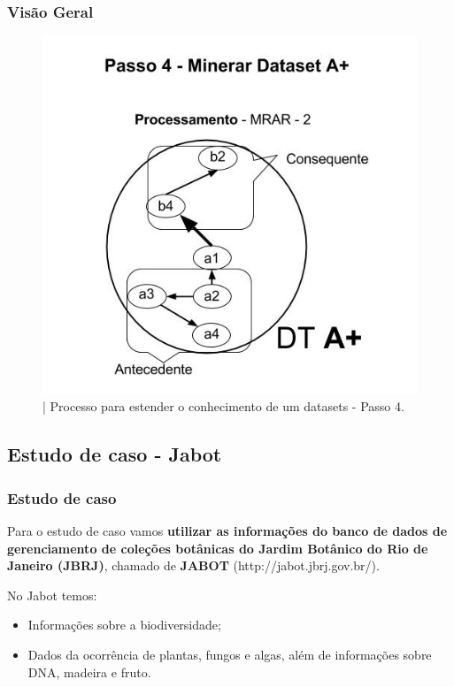 \documentclass[hyperref={pdfpagelabels=false}]{beamer}
\begin{document}
	\begin{frame}
    \frametitle{Visão Geral}
    \begin{figure}[h]
	\centering
		\includegraphics[scale=0.3]{img/VisaoGeralProposta4}
	\caption{| Processo para estender o conhecimento de um datasets  - Passo 4.}
	\label{fig:VisaoGeralProposta4}
\end{figure}
	\end{frame}
    
    
    
\subsection{Estudo de caso - Jabot}  


\begin{frame}
   \frametitle{Estudo de caso}
	Para o estudo de caso vamos  \textbf{utilizar as informações do banco de dados de gerenciamento de coleções botânicas do Jardim Botânico do Rio de Janeiro (JBRJ)}, chamado de  \textbf{JABOT} (http://jabot.jbrj.gov.br/).
    
   No Jabot temos:
    \begin{itemize}
        	\item Informações sobre a biodiversidade;
            \item Dados da ocorrência de plantas, fungos e algas, além de informações sobre DNA, madeira e fruto.
	\end{itemize}
\end{frame}
\end{document}
